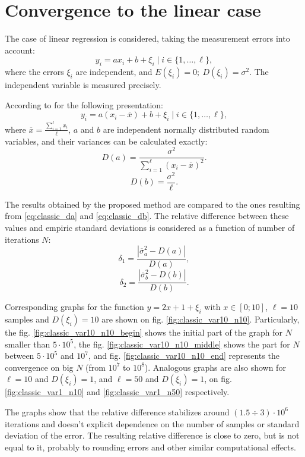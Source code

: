\documentclass[11pt,a4paper]{article}
\theoremstyle{definition}
\begin{document}
\section{Convergence to the linear case}

The case of linear regression is considered, taking the measurement errors
into account:
\[
  y_i = ax_i + b + \xi_i \mid i \in \{ 1, \dots, \ell \},
\]
where the errors $\xi_i$ are independent, and $E(\xi_i) = 0;\ D(\xi_i) = \sigma^2$.
The independent variable is measured precisely.

According to \citep{Vatunin05_en} for the following presentation:
\[
  y_i = a(x_i - \overline{x}) + b + \xi_i \mid i \in \{ 1, \dots, \ell \},
\]
where $\overline{x} = \frac{\sum_{i = 1}^\ell x_i}{\ell}$, $a$ and $b$ are
independent normally distributed random variables, and
their variances can be calculated exactly:
\begin{equation}
  \label{eq:classic_da}
  D(a) = \frac{\sigma^2}{\sum_{i = 1}^\ell (x_i - \overline{x})^2}.
\end{equation}
\begin{equation}
  \label{eq:classic_db}
  D(b) = \frac{\sigma^2}{\ell}.
\end{equation}

The results obtained by the proposed method are compared to the ones resulting
from \eqref{eq:classic_da} and \eqref{eq:classic_db}. The relative difference
between these values and empiric standard deviations is considered as a function of
number of iterations $N$:
\[
  \delta_1 = \frac{| \overline{\sigma}_a^2 - D(a) |}{D(a)},
\]
\[
  \delta_2 = \frac{| \overline{\sigma}_b^2 - D(b) |}{D(b)}.
\]

Corresponding graphs for the function $y = 2x + 1 + \xi_i$ with $x \in [0; 10]$,
$\ell = 10$ samples and $D(\xi_i) = 10$ are shown on fig. \ref{fig:classic_var10_n10}.
Particularly, the fig. \ref{fig:classic_var10_n10_begin} shows the initial part of the
graph for $N$ smaller than $5 \cdot 10^5$, the fig. \ref{fig:classic_var10_n10_middle}
shows the part for $N$ between $5 \cdot 10^5$ and $10^7$, and fig.
\ref{fig:classic_var10_n10_end} represents the convergence on big $N$ (from $10^7$ to $10^8$).
Analogous graphs are also shown for $\ell = 10$ and $D(\xi_i) = 1$, and $\ell = 50$ and $D(\xi_i) = 1$,
on fig. \ref{fig:classic_var1_n10} and \ref{fig:classic_var1_n50} respectively.

The graphs show that the relative difference stabilizes around $(1.5 \div 3) \cdot 10^6$
iterations and doesn't explicit dependence on the number of samples or standard
deviation of the error. The resulting relative difference is close to zero, but is
not equal to it, probably to rounding errors and other similar computational effects.
\end{document}
